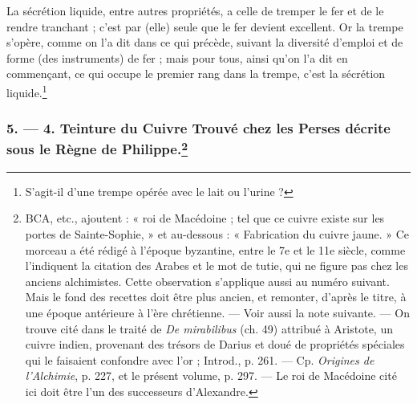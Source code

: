 \documentclass[a4paper, 11pt, oneside, polutonikogreek, french]{article}
\begin{document}
La sécrétion liquide, entre autres propriétés, a celle de tremper le fer et de le rendre tranchant ; c'est par (elle) seule que le fer devient excellent. Or la trempe s'opère, comme on l'a dit dans ce qui précède, suivant la diversité d'emploi et de forme (des instruments) de fer ; mais pour tous, ainsi qu'on l'a dit en commençant, ce qui occupe le premier rang dans la trempe, c'est la sécrétion liquide.\footnote{S'agit-il d'une trempe opérée avec le lait ou l'urine ?}

\bigskip
\centerline{\EightStarTaper}
\centerline{\EightStarTaper\EightStarTaper}
\bigskip

\subsubsection[5. --- 4. Teinture du Cuivre Trouvé chez les Perses décrite sous le Règne de Philippe.]{5. --- 4. Teinture du Cuivre Trouvé chez les Perses décrite sous le Règne de Philippe.\footnote{BCA, etc., ajoutent : « roi de Macédoine ; tel que ce cuivre existe sur les portes de Sainte-Sophie, » et au-dessous : « Fabrication du cuivre jaune. » Ce morceau a été rédigé à l'époque byzantine, entre le 7e et le 11e siècle, comme l'indiquent la citation des Arabes et le mot de tutie, qui ne figure pas chez les anciens alchimistes. Cette observation s'applique aussi au numéro suivant. Mais le fond des recettes doit être plus ancien, et remonter, d'après le titre, à une époque antérieure à l'ère chrétienne. --- Voir aussi la note suivante. --- On trouve cité dans le traité de \emph{De mirabilibus} (ch. 49) attribué à Aristote, un cuivre indien, provenant des trésors de Darius et doué de propriétés spéciales qui le faisaient confondre avec l'or ; Introd., p. 261. --- Cp. \emph{Origines de l'Alchimie}, p. 227, et le présent volume, p. 297. --- Le roi de Macédoine cité ici doit être l'un des successeurs d'Alexandre.}}
\end{document}
